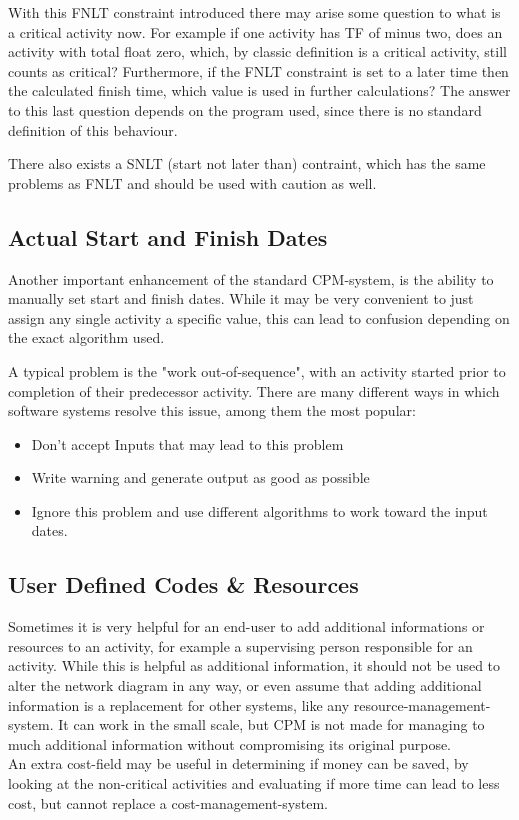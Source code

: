 With this FNLT constraint introduced there may arise some question to what is a critical activity now. For example if one activity has TF of minus two, does an activity with total float zero, which, by classic definition is a critical activity, still counts as critical? Furthermore, if the FNLT constraint is set to a later time then the calculated finish time, which value is used in further calculations? The answer to this last question depends on the program used, since there is no standard definition of this behaviour.

There also exists a SNLT (start not later than) contraint, which has the same problems as FNLT and should be used with caution as well.

\subsection{Actual Start and Finish Dates}

Another important enhancement of the standard CPM-system, is the ability to manually set start and finish dates. While it may be very convenient to just assign any single activity a specific value, this can lead to confusion depending on the exact algorithm used.

A typical problem is the "work out-of-sequence", with an activity started prior to completion of their predecessor activity.
There are many different ways in which software systems resolve this issue, among them the most popular:
\begin{itemize}
	\item Don't accept Inputs that may lead to this problem
	\item Write warning and generate output as good as possible
	\item Ignore this problem and use different algorithms to work toward the input dates.
\end{itemize}

\subsection{User Defined Codes \& Resources}

Sometimes it is very helpful for an end-user to add additional informations or resources to an activity, for example a supervising person responsible for an activity. While this is helpful as additional information, it should not be used to alter the network diagram in any way, or even assume that adding additional information is a replacement for other systems, like any resource-management-system. It can work in the small scale, but CPM is not made for managing to much additional information without compromising its original purpose.\\
An extra cost-field may be useful in determining if money can be saved, by looking at the non-critical activities and evaluating if more time can lead to less cost, but cannot replace a cost-management-system. 
